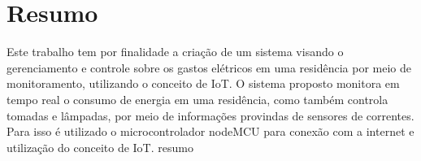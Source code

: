 \chapter*{Resumo}
Este trabalho tem por finalidade a criação de um sistema visando o gerenciamento e controle sobre os gastos elétricos em uma residência por meio de monitoramento, utilizando o conceito de IoT. O sistema proposto monitora em tempo real o consumo de energia em uma residência, como também controla tomadas e lâmpadas, por meio de informações provindas de sensores de correntes. Para isso é utilizado o microcontrolador nodeMCU para conexão com a internet e utilização do conceito de IoT.
\noindent resumo
